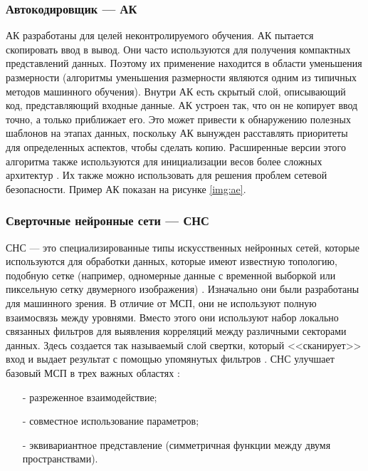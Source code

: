 
\FloatBarrier

\subsubsection*{Автокодировщик --- АК}

АК разработаны для целей неконтролируемого обучения. АК пытается скопировать ввод в вывод. Они часто используются для получения компактных представлений данных. Поэтому их применение находится в области уменьшения размерности (алгоритмы уменьшения размерности являются одним из типичных методов машинного обучения). Внутри АК есть скрытый слой, описывающий код, представляющий входные данные. АК устроен так, что он не копирует ввод точно, а только приближает его. Это может привести к обнаружению полезных шаблонов на этапах данных, поскольку АК вынужден расставлять приоритеты для определенных аспектов, чтобы сделать копию. Расширенные версии этого алгоритма также используются для инициализации весов более сложных архитектур \cite{introdmachlearn}. Их также можно использовать для решения проблем сетевой безопасности. Пример АК показан на рисунке \ref{img:ae}.


\FloatBarrier

\subsubsection*{Сверточные нейронные сети --- СНС}

СНС --- это специализированные типы искусственных нейронных сетей, которые используются для обработки данных, которые имеют известную топологию, подобную сетке (например, одномерные данные с временной выборкой или пиксельную сетку двумерного изображения) \cite{introdmachlearn}. Изначально они были разработаны для машинного зрения. В отличие от МСП, они не используют полную взаимосвязь между уровнями. Вместо этого они используют набор локально связанных фильтров для выявления корреляций между различными секторами данных. Здесь создается так называемый слой свертки, который <<сканирует>> вход и выдает результат с помощью упомянутых фильтров \cite{deeplearninmob}. СНС улучшает базовый МСП в трех важных областях \cite{introdmachlearn}:
\begin{itemize}
	\item[-] разреженное взаимодействие;
	\item[-] совместное использование параметров;
	\item[-] эквивариантное представление (симметричная функции между двумя пространствами).
\end{itemize}

